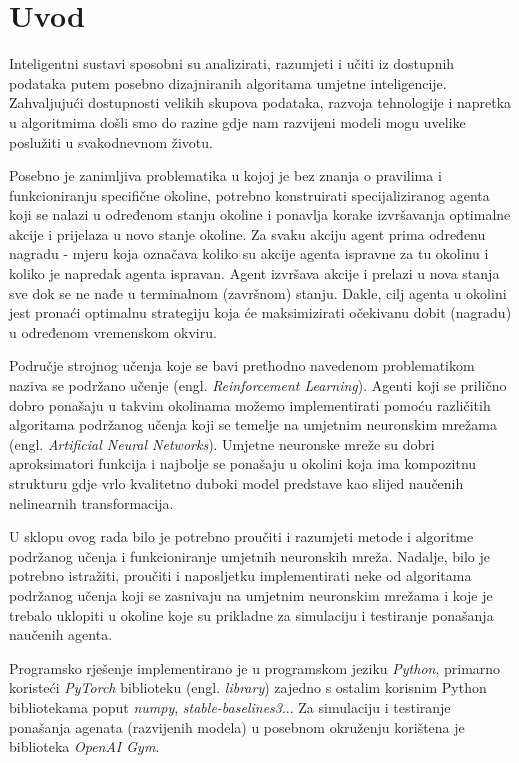 \chapter{Uvod}
Inteligentni sustavi sposobni su analizirati, razumjeti i učiti iz dostupnih podataka putem posebno dizajniranih algoritama umjetne inteligencije. Zahvaljujući dostupnosti velikih skupova podataka, razvoja tehnologije i napretka u algoritmima došli smo do razine gdje nam razvijeni modeli mogu uvelike poslužiti u svakodnevnom životu.

Posebno je zanimljiva problematika u kojoj je bez znanja o pravilima i funkcioniranju specifične okoline, potrebno konstruirati specijaliziranog agenta koji se nalazi u određenom stanju okoline i ponavlja korake izvršavanja optimalne akcije i prijelaza u novo stanje okoline. Za svaku akciju agent prima određenu nagradu - mjeru koja označava koliko su akcije agenta ispravne za tu okolinu i koliko je napredak agenta ispravan. Agent izvršava akcije i prelazi u nova stanja sve dok se ne nađe u terminalnom (završnom) stanju. Dakle, cilj agenta u okolini jest pronaći optimalnu strategiju koja će maksimizirati očekivanu dobit (nagradu) u određenom vremenskom okviru.

Područje strojnog učenja koje se bavi prethodno navedenom problematikom naziva se podržano učenje (engl. \textit{Reinforcement Learning}). Agenti koji se prilično dobro ponašaju u takvim okolinama možemo implementirati pomoću različitih algoritama podržanog učenja koji se temelje na umjetnim neuronskim mrežama (engl. \textit{Artificial Neural Networks}). Umjetne neuronske mreže su dobri aproksimatori funkcija i najbolje se ponašaju u okolini koja ima kompozitnu strukturu gdje vrlo kvalitetno duboki model predstave kao slijed naučenih nelinearnih transformacija.

U sklopu ovog rada bilo je potrebno proučiti i razumjeti metode i algoritme podržanog učenja i funkcioniranje umjetnih neuronskih mreža. Nadalje, bilo je potrebno istražiti, proučiti i naposljetku implementirati neke od algoritama podržanog učenja koji se zasnivaju na umjetnim neuronskim mrežama i koje je trebalo uklopiti u okoline koje su prikladne za simulaciju i testiranje ponašanja naučenih agenta.

Programsko rješenje implementirano je u programskom jeziku \textit{Python}, primarno koristeći \textit{PyTorch} biblioteku (engl. \textit{library}) zajedno s ostalim korisnim Python bibliotekama poput \textit{numpy}, \textit{stable-baselines3}... Za simulaciju i testiranje ponašanja agenata (razvijenih modela) u posebnom okruženju korištena je biblioteka \textit{OpenAI Gym}. 
